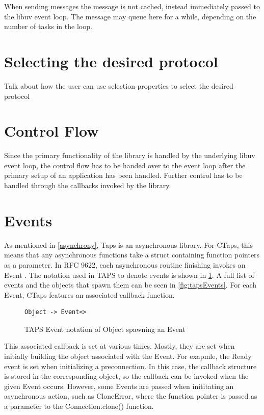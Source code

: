 When sending messages the message is not cached, instead
immediately passed to the libuv event loop. The message
may queue here for a while, depending on the number of tasks
in the loop.



\section{Selecting the desired protocol}
Talk about how the user can use selection properties to select the desired protocol 

\section{Control Flow}
Since the primary functionality of the library is handled
by the underlying libuv event loop, the control flow has
to be handed over to the event loop after the primary setup
of an application has been handled. Further control has
to be
handled through the callbacks invoked by the library.

\section{Events}
As mentioned in \cref{asynchrony}, Taps is an asynchronous library.
For CTaps, this means that any asynchronous functions take a struct
containing function pointers as a parameter. In RFC 9622, each
asynchronous routine finishing invokes an Event \cite{trammellAbstractApplicationProgramming2025}.
The notation used in TAPS to denote events is shown in \cref{fig:ctapsEventNotation}.
A full list of events and the objects that spawn them can
be seen in \cref{fig:tapsEvents}. For each Event, CTaps
features an associated callback function.

\begin{figure}[H]
\centering
\begin{BVerbatim}
Object -> Event<>
\end{BVerbatim}
\caption{TAPS Event notation of Object spawning an Event}
\label{fig:ctapsEventNotation}
\end{figure}

This associated callback is set at various times. Mostly,
they are set when initially building the object associated
with the Event. For exapmle, the Ready event is set
when initializing a preconnection. 
In this case, the callback structure is stored in the
corresponding object, so the callback can be invoked when
the given Event occurs.
However, some Events are passed when inititating an asynchronous action,
such as CloneError, where the function pointer is passed as a parameter
to the Connection.clone() function. 

